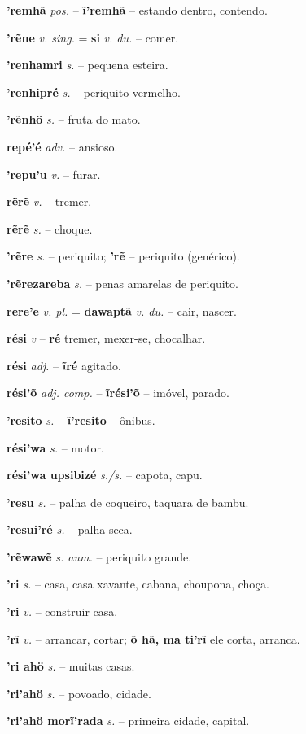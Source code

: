 \textbf{'remhã} \textit{pos.} -- \textbf{ĩ'remhã} -- estando dentro, contendo.

\textbf{'rẽne} \textit{v. sing.} = \textbf{si} \textit{v. du.} -- comer.

\textbf{'renhamri} \textit{s.} -- pequena esteira.

\textbf{'renhipré} \textit{s.} -- periquito vermelho.

\textbf{'rẽnhö} \textit{s.} -- fruta do mato.

\textbf{repé'é} \textit{adv.} -- ansioso.

\textbf{'repu'u} \textit{v.} -- furar.

\textbf{rẽrẽ} \textit{v.} -- tremer.

\textbf{rẽrẽ} \textit{s.} -- choque.

\textbf{'rẽre} \textit{s.} -- periquito; \textbf{'rẽ} -- periquito (genérico).

\textbf{'rẽrezareba} \textit{s.} -- penas amarelas de periquito.

\textbf{rere'e} \textit{v. pl.} = \textbf{dawaptã} \textit{v. du.} -- cair, nascer.

\textbf{rési} \textit{v} -- \textbf{ré} tremer, mexer-se, chocalhar.

\textbf{rési} \textit{adj.} -- \textbf{ĩré} agitado.

\textbf{rési'õ} \textit{adj. comp.} -- \textbf{ĩrési'õ} -- imóvel, parado.

\textbf{'resito} \textit{s.} -- \textbf{ĩ'resito} -- ônibus.

\textbf{rési'wa} \textit{s.} -- motor.

\textbf{rési'wa upsibizé} \textit{s./s.} -- capota, capu.

\textbf{'resu} \textit{s.} -- palha de coqueiro, taquara de bambu.

\textbf{'resui'ré} \textit{s.} -- palha seca.

\textbf{'rẽwawẽ} \textit{s. aum.} -- periquito grande.

\textbf{'ri} \textit{s.} -- casa, casa xavante, cabana, choupona, choça.

\textbf{'ri} \textit{v.} -- construir casa.

\textbf{'rĩ} \textit{v.} -- arrancar, cortar; \textbf{õ hã, ma ti'rĩ} ele corta, arranca.

\textbf{'ri ahö} \textit{s.} -- muitas casas.

\textbf{'ri'ahö} \textit{s.} -- povoado, cidade.

\textbf{'ri'ahö morĩ'rada} \textit{s.} -- primeira cidade, capital.


